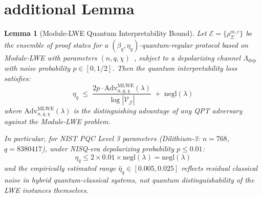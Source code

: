 \documentclass{ieeeaccess}
\newtheorem{lemma}{Lemma}[section]
\begin{document}
\section{additional Lemma}\label{app:lwe_dep}
\begin{lemma}[Module-LWE Quantum Interpretability Bound]
\label{lem:lwe_dep}
Let $\mathcal{E} = \{\rho_\Sigma^{m,c}\}$ be the ensemble of proof states 
for a $(\beta_q, \eta_q)$-quantum-regular protocol based on Module-LWE 
with parameters $(n, q, χ)$~\cite{Langlois2015}, subject to a 
depolarizing channel $\Lambda_{\mathrm{dep}}$ with noise probability 
$p \in [0, 1/2]$. Then the quantum interpretability loss satisfies:
\begin{equation}
    \eta_q \;\leq\; \frac{2p \cdot \mathrm{Adv}^{\mathrm{MLWE}}_{n,q,χ}(\lambda)}
    {\log|\mathcal{V}_\mathcal{J}|} \;+\; \mathrm{negl}(\lambda)
\end{equation}
where $\mathrm{Adv}^{\mathrm{MLWE}}_{n,q,χ}(\lambda)$ is the 
distinguishing advantage of any QPT adversary against the 
Module-LWE problem.

In particular, for NIST PQC Level 3 parameters 
(Dilithium-3: $n=768$, $q=8380417$), under NISQ-era 
depolarizing probability $p \leq 0.01$:
\begin{equation}
    \eta_q \leq 2 \times 0.01 \times \mathrm{negl}(\lambda) 
    = \mathrm{negl}(\lambda)
\end{equation}
and the empirically estimated range $\hat{\eta}_q \in [0.005, 0.025]$ 
reflects residual classical noise in hybrid quantum-classical systems, 
not quantum distinguishability of the LWE instances themselves.
\end{lemma}
\end{document}
